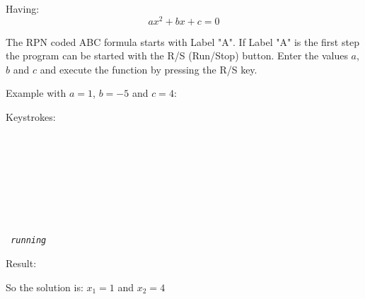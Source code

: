 \documentclass[a4paper, landscape]{article}
\begin{document}
Having:
$$ a x^2 + b x + c = 0 $$ 

\bigskip

The RPN coded ABC formula starts with Label "A". If Label "A" is the first step the program can be started with the R/S (Run/Stop) button. Enter the values $a$, $b$ and $c$ and execute the function by pressing the R/S key.

\bigskip
Example with  $a = 1$, $ b = -5$ and $c = 4$:

\bigskip
Keystrokes: \\
\tt
\indent {} \\
\indent \ENTERfic \\
\indent {} \\
\indent \CHSfic \\
\indent \ENTERfic \\
\indent {} \\
\indent \RSfic \\
\\
\indent \it { running }
\rm

\bigskip
Result:
\XswapYfic
{}

\bigskip
So the solution is: $x_1 = 1$ and $x_2 = 4$

\bigskip
\end{document}
